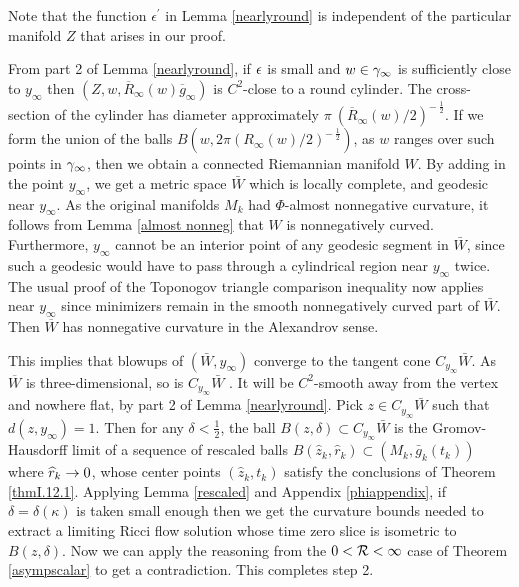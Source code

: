 Note that the function $\epsilon^\prime$ in Lemma
\ref{nearlyround} is independent of the particular manifold
$Z$ that arises in our proof.

From part 2 of Lemma \ref{nearlyround}, if
$\epsilon$ is small and $ w \in \gamma_\infty$ is
sufficiently close to $y_\infty$ then
$(Z, w, \overline{R}_\infty(w) \overline{g}_\infty)$ is
$C^2$-close to a round cylinder.  The cross-section
of the cylinder has diameter approximately
$\pi \: (\overline{R}_\infty(w)/2)^{- \: \frac12}$.
If we form the
union of the balls $B(w,2\pi(R_\infty(w)/2)^{- \: \frac{1}{2}})$, as $w$
ranges over such points in $\gamma_\infty$, then we obtain a
connected Riemannian manifold $W$.
By adding in the point $y_\infty$, we get a
metric space $\bar W$ which is locally complete, and geodesic
near $y_\infty$. As the original manifolds $M_k$ had
$\Phi$-almost nonnegative curvature, it follows
from Lemma \ref{almost nonneg}
that $W$ is
nonnegatively curved.  Furthermore,
$y_\infty$ cannot be an interior point of any geodesic segment in
$\bar W$, since such a geodesic would have to pass through a cylindrical
region near $y_\infty$
twice.  The usual
proof of the Toponogov triangle comparison inequality now applies near
$y_\infty$ since
minimizers remain in the smooth nonnegatively curved part of $\bar W$.
Then $\overline{W}$ has nonnegative curvature in the Alexandrov sense.


This implies that blowups of $(\bar W,y_\infty)$ converge
to the tangent cone $C_{y_\infty}\bar W$.
As $\overline{W}$ is three-dimensional, so is
$C_{y_\infty}\bar W$
\cite[Corollary 7.11]{Burago-Gromov-Perelman}.
It will be
$C^2$-smooth away from the vertex and nowhere flat, by
part 2 of Lemma \ref{nearlyround}.
Pick $z\in C_{y_\infty}\bar W $ such that $d(z,y_\infty)=1$.
Then
for any $\delta < \frac12$,
the ball $B(z,\delta)\subset C_{y_\infty}\bar W $
is the Gromov-Hausdorff limit of a sequence of
rescaled balls
$B(\widehat{z}_k,\widehat{r}_k)\subset (M_k,\bar g_k(t_k))$
where $\widehat{r}_k\rightarrow 0$, whose center points $(\widehat{z}_k,t_k)$
satisfy the conclusions of Theorem
\ref{thmI.12.1}.  Applying Lemma \ref{rescaled}
and Appendix \ref{phiappendix},
if $\delta = \delta(\kappa)$ is taken small enough then
we get the curvature bounds needed to extract a limiting
Ricci flow solution whose time zero slice is isometric
to $B(z,\delta)$.
Now we can apply
the reasoning from the $0<{\mathcal R}<\infty$ case of Theorem
\ref{asympscalar} to get a contradiction.  This completes step 2.

